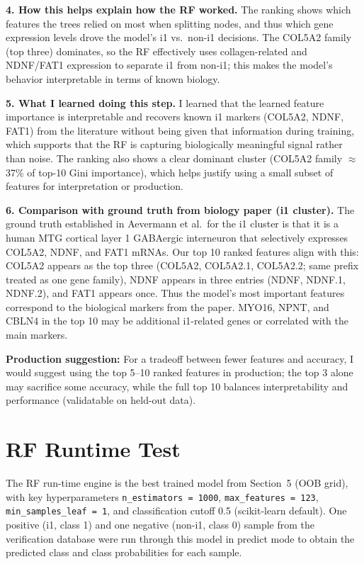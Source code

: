 \documentclass[11pt]{article}
\begin{document}
\textbf{4. How this helps explain how the RF worked.} The ranking shows which features the trees relied on most when splitting nodes, and thus which gene expression levels drove the model's i1 vs.\ non-i1 decisions. The COL5A2 family (top three) dominates, so the RF effectively uses collagen-related and NDNF/FAT1 expression to separate i1 from non-i1; this makes the model's behavior interpretable in terms of known biology.

\textbf{5. What I learned doing this step.} I learned that the learned feature importance is interpretable and recovers known i1 markers (COL5A2, NDNF, FAT1) from the literature without being given that information during training, which supports that the RF is capturing biologically meaningful signal rather than noise. The ranking also shows a clear dominant cluster (COL5A2 family $\approx$ 37\% of top-10 Gini importance), which helps justify using a small subset of features for interpretation or production.

\textbf{6. Comparison with ground truth from biology paper (i1 cluster).} The ground truth established in Aevermann et al.\ for the i1 cluster is that it is a human MTG cortical layer 1 GABAergic interneuron that selectively expresses COL5A2, NDNF, and FAT1 mRNAs. Our top 10 ranked features align with this: COL5A2 appears as the top three (COL5A2, COL5A2.1, COL5A2.2; same prefix treated as one gene family), NDNF appears in three entries (NDNF, NDNF.1, NDNF.2), and FAT1 appears once. Thus the model's most important features correspond to the biological markers from the paper. MYO16, NPNT, and CBLN4 in the top 10 may be additional i1-related genes or correlated with the main markers.

\textbf{Production suggestion:} For a tradeoff between fewer features and accuracy, I would suggest using the top 5--10 ranked features in production; the top 3 alone may sacrifice some accuracy, while the full top 10 balances interpretability and performance (validatable on held-out data).

\section{RF Runtime Test}

The RF run-time engine is the best trained model from Section~5 (OOB grid), with key hyperparameters \texttt{n\_estimators = 1000}, \texttt{max\_features = 123}, \texttt{min\_samples\_leaf = 1}, and classification cutoff 0.5 (scikit-learn default). One positive (i1, class 1) and one negative (non-i1, class 0) sample from the verification database were run through this model in predict mode to obtain the predicted class and class probabilities for each sample.
\end{document}
